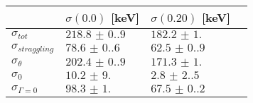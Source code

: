 \begin{tabular}{llll} \hline
\toprule 
 & $\sigma(0.0)$ [keV]  &  $\sigma(0.20)$ [keV]  \\ \midrule 
$\sigma_{tot}$ & $\num{218.8(0.9)}$ & $\num{182.2(1.0)}$\\ 
$\sigma_{straggling}$ & $\num{78.6(0.6)}$ & $\num{62.5(0.9)}$\\ 
$\sigma_{\theta}$ & $\num{202.4(0.9)}$ & $\num{171.3(1.0)}$\\ 
$\sigma_{0}$ & $\num{10.2(9.0)}$ & $\num{2.8(2.5)}$\\ 
$\sigma_{\Gamma=0}$ & $\num{98.3(1.0)}$ & $\num{67.5(0.2)}$\\ 
 \bottomrule 
\end{tabular}

